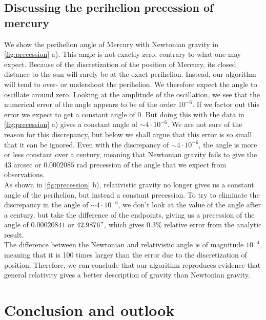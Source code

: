 \documentclass[a4paper, 10pt]{article}
\begin{document}
\subsection{Discussing the perihelion precession of mercury}
We show the perihelion angle of Mercury with Newtonian gravity in \cref{fig:precession} a). This angle is not exactly zero, contrary to what one may expect. Because of the discretization of the position of Mercury, its closed distance to the sun will rarely be at the exact perihelion. Instead, our algorithm will tend to over- or undershoot the perihelion. We therefore expect the angle to oscillate around zero. Looking at the amplitude of the oscillation,  we see that the numerical error of the angle appears to be of the order $10^{-6}$. If we factor out this error we expect to get a constant angle of 0. But doing this with the data in \cref{fig:precession} a) gives a constant angle of $\sim 4 \cdot 10^{-6}$. We are not sure of the reason for this discrepancy, but below we shall argue that this error is so small that it can be ignored. Even with the discrepancy of $\sim 4 \cdot 10^{-6}$, the angle is more or less constant over a century, meaning that Newtonian gravity fails to give the 43 arcsec or $0.0002085$ rad precession of the angle that we expect from observations.\\
\linebreak
As shown in \cref{fig:precession} b), relativistic gravity no longer gives us a constant angle of the perihelion, but instead a constant precession. To try to eliminate the discrepancy in the angle of $\sim 4 \cdot 10^{-6}$, we don't look at the value of the angle after a century, but take the difference of the endpoints, giving us a precession of the angle of $0.00020841$ or $42.9876"$, which gives $0.3\%$ relative error from the analytic result. \\
\linebreak
The difference between the Newtonian and relativistic angle is of magnitude $10^{-4}$, meaning that it is 100 times larger than the error due to the discretization of position. Therefore, we can conclude that our algorithm reproduces evidence that general relativity gives a better description of gravity than Newtonian gravity.
\newpage
\section{Conclusion and outlook}
\end{document}
